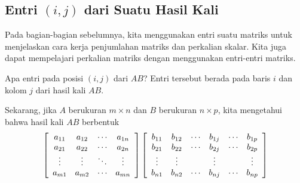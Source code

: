 \subsection{Entri \texorpdfstring{$(i,j)$}{(i,j)} dari Suatu Hasil Kali}

Pada bagian-bagian sebelumnya, kita menggunakan entri suatu matriks untuk menjelaskan cara kerja penjumlahan matriks dan perkalian skalar.
Kita juga dapat mempelajari perkalian matriks dengan menggunakan entri-entri matriks. 

Apa entri pada posisi $(i,j)$ dari $AB$? Entri tersebut berada pada baris $i$
dan kolom $j$ dari hasil kali $AB$.
 
Sekarang, jika $A$ berukuran $m \times n$ dan $B$ berukuran $n \times p$, kita mengetahui bahwa hasil kali $AB$ berbentuk
\begin{equation*}
\left[
\begin{array}{cccc}
a_{11} & a_{12} & \cdots & a_{1n} \\
a_{21} & a_{22} & \cdots & a_{2n} \\
\vdots & \vdots &  \ddots & \vdots \\
a_{m1} & a_{m2} & \cdots & a_{mn}
\end{array}
\right] \left[
\begin{array}{cccccc}
b_{11} & b_{12} & \cdots & b_{1j} & \cdots & b_{1p} \\
b_{21} & b_{22} & \cdots & b_{2j} & \cdots & b_{2p} \\
\vdots & \vdots &  & \vdots & & \vdots\\
b_{n1} & b_{n2} & \cdots & b_{nj} & \cdots & b_{np}
\end{array}
\right] 
\end{equation*}

